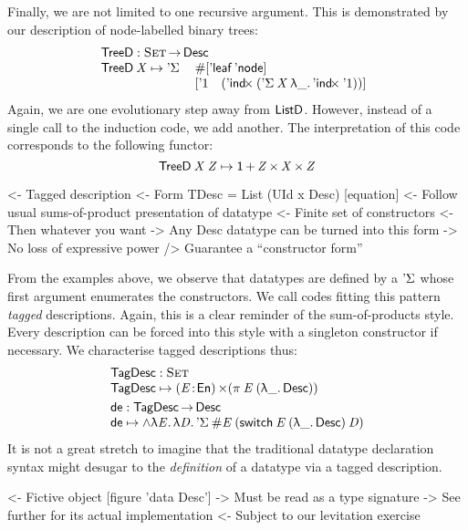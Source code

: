 Finally, we are not limited to one recursive argument. This is
demonstrated by our description of node-labelled binary trees:
%
\[\stk{
\TreeD : \Set \To \Desc \\
\begin{array}{@{}ll}
\TreeD \: \V{X} \mapsto \DSigma{ & \EnumT{\sqr{ \TreeLeaf\: \TreeNode }} \\}
  { & \sqr{ \DUnit \quad
       ( \DIndx{(\DSigma{\V{X}}{\LAM{\_}\DIndx{\DUnit}})})} }
\end{array}
}\]
%
Again, we are one evolutionary step away from $\ListD$. However,
instead of a single call to the induction code, we add another. The
interpretation of this code corresponds to the following functor:
%
\[    \TreeD\: \V{X}\: \V{Z} \mapsto \Unit \mathop{\D{+}} 
          \V{Z} \Prod \V{X}  \Prod \V{Z}     \]


\begin{wstructure}
<- Tagged description
    <- Form TDesc = List (UId x Desc) [equation]
    <- Follow usual sums-of-product presentation of datatype
        <- Finite set of constructors
        <- Then whatever you want
    -> Any Desc datatype can be turned into this form
        -> No loss of expressive power
        /> Guarantee a ``constructor form''
\end{wstructure}

From the examples above, we observe that datatypes are defined by a
$\SYMBDSigma$ whose first argument enumerates the constructors. We
call codes fitting this pattern \emph{tagged} descriptions. Again,
this is a clear reminder of the sum-of-products style. Every
description can be forced into this style with a singleton constructor
if necessary. We characterise tagged descriptions thus:
\[\stk{
 \TagDesc : \Set \\
 \TagDesc \mapsto \SIGMA{\V{E}}{\EnumU} (\spi{\V{E}}{(\LAM{\_} \Desc)})
\smallskip\\
\SYMBtoDesc : \TagDesc\To\Desc \\
\SYMBtoDesc \mapsto
\spl{\LAM{\V{E}}\LAM{\V{D}}
\DSigma{\EnumT{\V{E}}}{(\F{switch}\:\V{E}\:(\LAM{\_}\Desc)\:\V{D})}}
}\]
It is not a great stretch to imagine that the traditional datatype
declaration syntax might desugar to the \emph{definition} of a datatype
via a tagged description.

\begin{wstructure}
<- Fictive object [figure 'data Desc']
    -> Must be read as a type signature
    -> See further for its actual implementation
        <- Subject to our levitation exercise
\end{wstructure}

